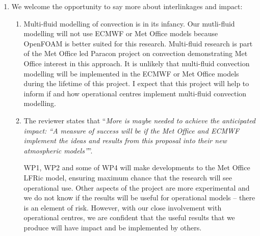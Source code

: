 \begin{enumerate}
\item \label{it:interlinkages} We welcome the opportunity to say more about interlinkages and impact:
    \begin{enumerate}
    \item Multi-fluid modelling of convection is in its infancy. Our mutli-fluid modelling  will not use ECMWF or Met Office models because OpenFOAM is better suited for this research. Multi-fluid research is part of the Met Office led Paracon project on convection demonstrating Met Office interest in this approach. It is unlikely that multi-fluid convection modelling will be implemented in the ECMWF or Met Office models during the lifetime of this project. I expect that this project will help to inform if and how operational centres implement multi-fluid convection modelling.
    
    \item The reviewer states that ``{\it More is maybe needed to achieve the anticipated impact: ``A measure of success will be if the Met Office and ECMWF implement the ideas and results from this proposal into their new atmospheric models''}''.
    
    WP1, WP2 and some of WP4 will make developments to the Met Office LFRic model, ensuring maximum chance that the research will see operational use. Other aspects of the project are more experimental and we do not know if the results will be useful for operational models -- there is an element of risk. However, with our close involvement with operational centres, we are confident that the useful results that we produce will have impact and be implemented by others.
    \end{enumerate}

\end{enumerate}

